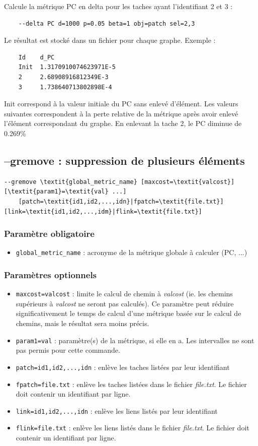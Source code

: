 \documentclass[a4paper,10pt]{report}
\begin{document}
Calcule la métrique PC en delta pour les taches ayant l'identifiant 2 et 3 :
\begin{Verbatim}
	--delta PC d=1000 p=0.05 beta=1 obj=patch sel=2,3
\end{Verbatim}
Le résultat est stocké dans un fichier pour chaque graphe. Exemple :
\begin{Verbatim}
	Id    d_PC
	Init  1.3170910074623971E-5
	2     2.68908916812349E-3
	3     1.738640713802898E-4
\end{Verbatim}
Init correspond à la valeur initiale du PC sans enlevé d'élément.
Les valeurs suivantes correspondent à la perte relative de la métrique après avoir enlevé l'élément correspondant du graphe.
En enlevant la tache 2, le PC diminue de 0.269\%


\subsection{--gremove : suppression de plusieurs éléments}
\begin{Verbatim}[commandchars=\\\{\}]
--gremove \textit{global_metric_name} [maxcost=\textit{valcost}] [\textit{param1}=\textit{val} ...]
	[patch=\textit{id1,id2,...,idn}|fpatch=\textit{file.txt}] [link=\textit{id1,id2,...,idm}|flink=\textit{file.txt}]
\end{Verbatim}

\subsubsection{Paramètre obligatoire}
\begin{itemize}
	\item \verb|global_metric_name| : acronyme de la métrique globale à calculer (PC, ...)
\end{itemize}

\subsubsection{Paramètres optionnels}
\begin{itemize}
	\item \verb|maxcost=valcost| : limite le calcul de chemin à \textit{valcost} (ie. les chemins supérieurs à \textit{valcost} ne seront pas calculés). Ce paramètre peut réduire significativement le temps de calcul d'une métrique basée sur le calcul de chemins, mais le résultat sera moins précis.
	\item \verb|param1=val| : paramètre(s) de la métrique, si elle en a. Les intervalles ne sont pas permis pour cette commande.
	\item \verb|patch=id1,id2,...,idn| : enlève les taches listées par leur identifiant
	\item \verb|fpatch=file.txt| : enlève les taches listées dans le fichier \textit{file.txt}. Le fichier doit contenir un identifiant par ligne.
	\item \verb|link=id1,id2,...,idn| : enlève les liens listés par leur identifiant
	\item \verb|flink=file.txt| : enlève les liens listés dans le fichier \textit{file.txt}. Le fichier doit contenir un identifiant par ligne.	
\end{itemize}
\end{document}
